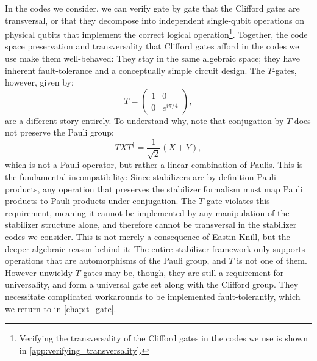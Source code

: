 In the codes we consider, we can verify gate by gate that the Clifford gates are transversal, or that they decompose into independent single-qubit operations on physical qubits that implement the correct logical operation\footnote{Verifying the transversality of the Clifford gates in the codes we use is shown in \cref{app:verifying_transversality}.}. %
Together, the code space preservation and transversality that Clifford gates afford in the codes we use make them well-behaved: They stay in the same algebraic space; they have inherent fault-tolerance and a conceptually simple circuit design. %
The $T$-gates, however, given by:
\[
T = \begin{pmatrix}
1 & 0 \\
0 & e^{i\pi/4}
\end{pmatrix},
\]
are a different story entirely. To understand why, note that conjugation by $T$ does not preserve the Pauli group:
\[
TXT^\dagger = \frac{1}{\sqrt{2}}(X + Y),
\]
which is not a Pauli operator, but rather a linear combination of Paulis. This is the fundamental incompatibility: Since stabilizers are by definition Pauli products, any operation that preserves the stabilizer formalism must map Pauli products to Pauli products under conjugation. The $T$-gate violates this requirement, meaning it cannot be implemented by any manipulation of the stabilizer structure alone, and therefore cannot be transversal in the stabilizer codes we consider. This is not merely a consequence of Eastin-Knill, but the deeper algebraic reason behind it: The entire stabilizer framework only supports operations that are automorphisms of the Pauli group, and $T$ is not one of them. However unwieldy $T$-gates may be, though, they are still a requirement for universality, and form a universal gate set along with the Clifford group. They necessitate complicated workarounds to be implemented fault-tolerantly, %
which we return to in \cref{chap:t_gate}.

